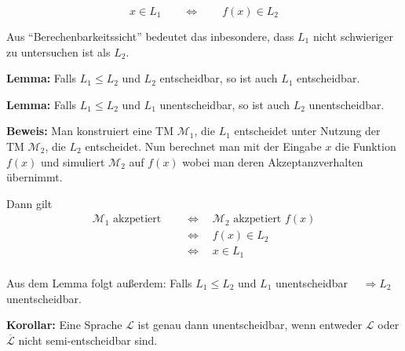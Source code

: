 \documentclass{scrartcl}%
\begin{document}
    \begin{equation*}
        x \in L_1 \qquad \Leftrightarrow \qquad f(x) \in L_2
    \end{equation*}

    Aus "`Berechenbarkeitssicht"' bedeutet das inbesondere, dass $L_1$ nicht schwieriger zu untersuchen ist als $L_2$.

    \vspace*{0.3cm}
    \textbf{\textsf{Lemma:}} Falls $L_1 \leq L_2$ und $L_2$ entscheidbar, so ist auch $L_1$ entscheidbar.

    \vspace*{0.3cm}
    \textbf{\textsf{Lemma:}} Falls $L_1 \leq L_2$ und $L_1$ unentscheidbar, so ist auch $L_2$ unentscheidbar.

    \vspace*{0.3cm}
    \textbf{\textsf{Beweis:}} Man konstruiert eine TM $\mathcal{M}_1$,
    die $L_1$ entscheidet unter Nutzung der TM $\mathcal{M}_2$, die $L_2$ entscheidet.
    Nun berechnet man mit der Eingabe $x$ die Funktion $f(x)$ und simuliert $\mathcal{M}_2$ auf $f(x)$ wobei man deren Akzeptanzverhalten übernimmt.

    \vspace*{0.3cm}
    Dann gilt
    \begin{align*}
        \mathcal{M}_1 \text{ akzpetiert } & \quad \Leftrightarrow \quad \mathcal{M}_2 \text{ akzpetiert } f(x) \\
        & \quad \Leftrightarrow \quad f(x) \in L_2 \\
        & \quad \Leftrightarrow \quad x \in L_1 \\
    \end{align*}\proofend

    \vspace*{0.3cm}
    Aus dem Lemma folgt außerdem: Falls $L_1 \leq L_2$ und $L_1$ unentscheidbar $\quad \Rightarrow L_2$ unentscheidbar.

    \vspace*{0.3cm}
    \textbf{\textsf{Korollar:}}
    Eine Sprache $\mathcal{L}$ ist genau dann unentscheidbar,
    wenn entweder $\mathcal{L}$ oder $\overline{\mathcal{L}}$ nicht semi-entscheidbar sind.
\end{document}
